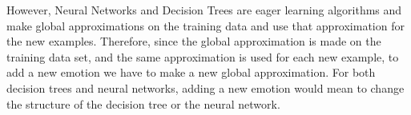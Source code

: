 \documentclass[a4paper,12pt,oneside,final]{report}
\begin{document}
\begin{enumerate}
    However, Neural Networks and Decision Trees are eager learning algorithms and make global approximations on the training data and
    use that approximation for the new examples. Therefore, since the global approximation is made on the training data set, 
    and the same approximation is used for each new example, to add a new emotion we have to make a new global approximation.
    For both decision trees and neural networks, adding a new emotion would mean to change the structure of the decision tree or the
    neural network.
\end{enumerate}




\begin{appendices}

\end{appendices}
\end{document}

